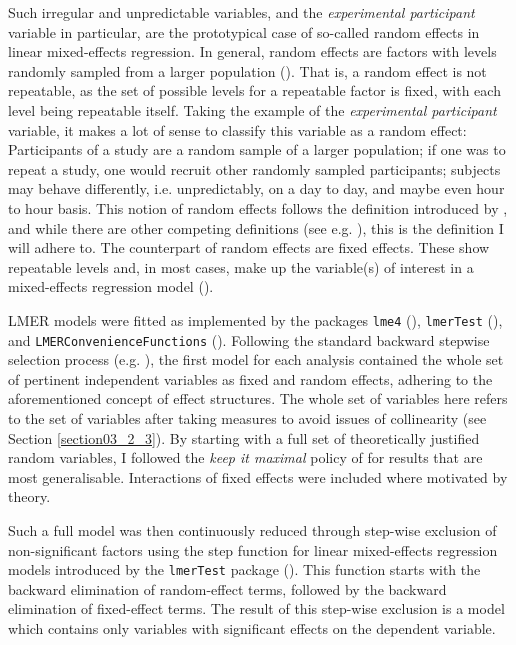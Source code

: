 Such irregular and unpredictable variables, and the \textit{experimental participant} variable in particular, are the prototypical case of so-called random effects in linear mixed-effects regression. In general, random effects are factors with levels randomly sampled from a larger population (\cite{Baayen2008}). That is, a random effect is not repeatable, as the set of possible levels for a repeatable factor is fixed, with each level being repeatable itself. Taking the example of the \textit{experimental participant} variable, it makes a lot of sense to classify this variable as a random effect: Participants of a study are a random sample of a larger population; if one was to repeat a study, one would recruit other randomly sampled participants; subjects may behave differently, i.e. unpredictably, on a day to day, and maybe even hour to hour basis. This notion of random effects follows the definition introduced by \citet{Green1960}, and while there are other competing definitions (see e.g. \cite{Kreft1998, Searle2009, Snijders2011, McElreath2015}), this is the definition I will adhere to. The counterpart of random effects are fixed effects. These show repeatable levels and, in most cases, make up the variable(s) of interest in a mixed-effects regression model (\cite{Baayen2008}).

LMER models were fitted as implemented by the packages \texttt{lme4} (\cite{Bates2015}), \texttt{lmerTest} (\cite{Kuznetsova2017}), and \texttt{LMERConvenienceFunctions} (\cite{Tremblay2020}). Following the standard backward stepwise selection process (e.g. \cite{Baayen2008}), the first model for each analysis contained the whole set of pertinent independent variables as fixed and random effects, adhering to the aforementioned concept of effect structures. The whole set of variables here refers to the set of variables after taking measures to avoid issues of collinearity (see Section \ref{section03_2_3}). By starting with a full set of theoretically justified random variables, I followed the \textit{keep it maximal} policy of \citet{Barr2013} for results that are most generalisable. Interactions of fixed effects were included where motivated by theory.

Such a full model was then continuously reduced through step-wise exclusion of non-significant factors using the step function for linear mixed-effects regression models introduced by the \texttt{lmerTest} package (\cite{Kuznetsova2017}). This function starts with the backward elimination of random-effect terms, followed by the backward elimination of fixed-effect terms. The result of this step-wise exclusion is a model which contains only variables with significant effects on the dependent variable.

